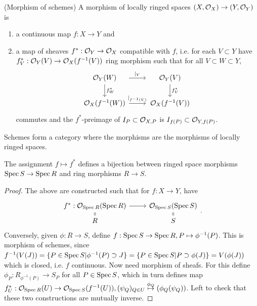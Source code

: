\documentclass[a4paper,11pt]{article}
\begin{document}
				\begin{defi}\label{def--scheme-morphism}(Morphism of schemes)
					A morphism of locally ringed spaces $(X,\mathcal{O}_X)\rightarrow(Y,\mathcal{O}_Y)$ is
					\begin{enumerate}
						\item a continuous map $f:X\rightarrow Y$ and
						\item a map of sheaves $f^\ast:\mathcal{O}_Y\rightarrow\mathcal{O}_X$ compatible with $f$, i.e. for each $V\subset Y$ have $f^\ast_V:\mathcal{O}_Y(V)\rightarrow\mathcal{O}_X(f^{-1}(V))$ ring morphism such that for all $V\subset W\subset Y$,
						\begin{equation*}
							\begin{tikzcd}[/tikz/column 1/.append style={nodes={text width=6em, text centered}},
								/tikz/column 2/.append style={nodes={text width=6em, text centered}}]
								\O_Y(W)\ar[r,"|_{V}"]\ar[d,"f^\ast_W"] & \O_Y(V)\ar[d,"f^\ast_V"]\\
								\O_X(f^{-1}(W))\ar[r,"|_{f^{-1}(V)}"] & \O_X(f^{-1}(V))
							\end{tikzcd}
						\end{equation*}
						commutes and the $f^\ast$-preimage of $I_P\subset\mathcal{O}_{X,P}$ is $I_{f(P)}\subset\mathcal{O}_{Y,f(P)}$.
					\end{enumerate}
				\end{defi}

				Schemes form a category where the morphisms are the morphisms of locally ringed spaces.

				\begin{prop}
					The assignment $f\mapsto f^\ast$ defines a bijection between ringed space morphisms $\operatorname{Spec} S\rightarrow\operatorname{Spec} R$ and ring morphisms $R\rightarrow S$.
				\end{prop}
				\begin{proof}
					The above are constructed such that for $f:X\rightarrow Y$, have 
					\begin{equation*}
						\begin{tikzcd}[row sep=tiny]
							f^\ast:\O_{\spec R}(\spec R)\ar[r]\ar[d,equal] & \O_{\spec S}(\spec S)\ar[d,equal]\\
							R & S
						\end{tikzcd}.
					\end{equation*}
					Conversely, given $\phi:R\rightarrow S$, define $f:\operatorname{Spec} S\rightarrow\operatorname{Spec} R, P\mapsto\phi^{-1}(P)$. This is morphism of schemes, since $f^{-1}(V(J))=\{P\in\operatorname{Spec} S|\phi^{-1}(P)\supset J\}=\{P\in\operatorname{Spec} S|P\supset\phi(J)\}=V(\phi(J))$ which is closed, i.e. $f$ continuous. Now need morphism of sheafs. For this define $\phi_P:R_{\phi^{-1}(P)}\rightarrow S_P$ for all $P\in\operatorname{Spec} S$, which in turn defines map $f^\ast_U:\mathcal{O}_{\operatorname{Spec} R}(U)\rightarrow\mathcal{O}_{\operatorname{Spec} S}(f^{-1}(U)),(\psi_Q)_{Q\in U}\overset{\phi_Q}{\mapsto}(\phi_Q(\psi_Q))$. Left to check that these two constructions are mutually inverse.
				\end{proof} 
\end{document}
